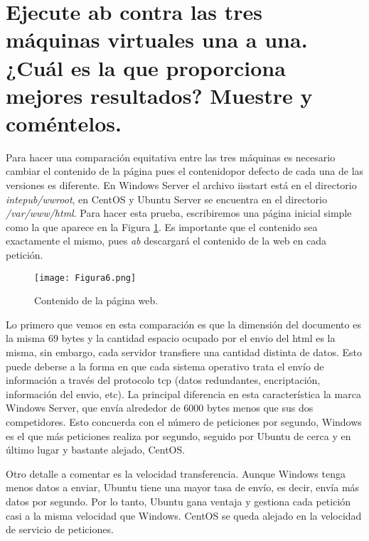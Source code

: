 


\section{Ejecute ab contra las tres máquinas virtuales una a una. ¿Cuál es la que proporciona mejores resultados? Muestre y coméntelos.}

Para hacer una comparación equitativa entre las tres máquinas es necesario cambiar el contenido de la página pues el contenidopor defecto de cada una de las 
versiones es diferente. En Windows Server el archivo iisstart está en el directorio \textit{intepub/wwroot}, en CentOS y Ubuntu Server se encuentra en el directorio
\textit{/var/www/html}. Para hacer esta prueba, escribiremos una página inicial simple como la que aparece en la Figura \ref{fig:figura6}. Es importante que el contenido
sea exactamente el mismo, pues \textit{ab} descargará el contenido de la web en cada petición.

\begin{figure}[H] 
\centering
\texttt{[image: Figura6.png]}  
\caption{Contenido de la página web.}\label{fig:figura6}
\end{figure}

Lo primero que vemos en esta comparación es que la dimensión del documento es la misma 69 bytes y la cantidad espacio ocupado por el envio del html es la 
misma, sin embargo, cada servidor transfiere una cantidad distinta de datos. Esto puede deberse a la forma en que cada sistema operativo trata el envío de 
información a través del protocolo tcp (datos redundantes, encriptación, información del envio, etc). La principal diferencia en esta característica la marca Windows
Server, que envía alrededor de 6000 bytes menos que sus dos competidores. Esto concuerda con el número de peticiones por segundo, Windows es el que más
peticiones realiza por segundo, seguido por Ubuntu de cerca y en último lugar y bastante alejado, CentOS.

\vspace{5mm}

Otro detalle a comentar es la velocidad transferencia. Aunque Windows tenga menos datos a enviar, Ubuntu tiene una mayor tasa de envío, es decir, envía más datos 
por segundo. Por lo tanto, Ubuntu gana ventaja y gestiona cada petición casi a la misma  velocidad que Windows. CentOS se queda alejado en la velocidad de servicio
de peticiones.

